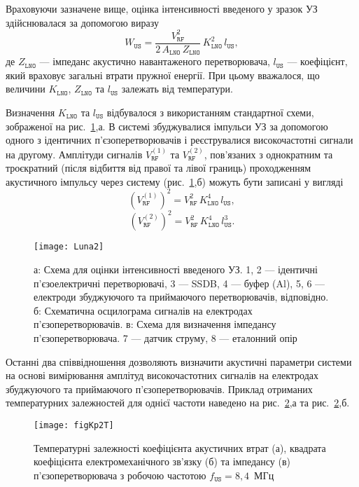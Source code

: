 Враховуючи зазначене вище, оцінка інтенсивності введеного у зразок УЗ здійснювалася за допомогою виразу
 \begin{equation}
 \label{eqWus2}
 W_\mathtt{US}=\frac{V_\mathtt{RF}^2}{2\,A_\mathtt{LNO}\,Z_\mathtt{LNO}}\,K_\mathtt{LNO}^2\,l_\mathtt{US},
 \end{equation}
де
$Z_\mathtt{LNO}$ --- імпеданс акустично навантаженого перетворювача,
$l_\mathtt{US}$ --- коефіцієнт, який враховує загальні втрати пружної енергії.
При цьому вважалося, що величини
$K_\mathtt{LNO}$, $Z_\mathtt{LNO}$ та $l_\mathtt{US}$ залежать від температури.

Визначення $K_\mathtt{LNO}$ та $l_\mathtt{US}$ відбувалося з використанням стандартної схеми,
зображеної на рис.~\ref{Luna2},а.
В системі збуджувалися імпульси УЗ за допомогою одного з ідентичних п'єзоперетворювачів і реєструвалися
високочастотні сигнали на другому.
Амплітуди сигналів $V_\mathtt{RF}^{(1)}$ та $V_\mathtt{RF}^{(2)}$, пов'язаних з однократним та троєкратний (після відбиття від правої та лівої границь) проходженням акустичного імпульсу через систему
(рис.~\ref{Luna2},б) можуть бути записані у вигляді
 \begin{equation}
 \label{eqVrf1}
 (V_\mathtt{RF}^{(1)})^2=V_\mathtt{RF}^2\,K_\mathtt{LNO}^4\,l_\mathtt{US},
 \end{equation}
 \begin{equation}
 \label{eqVrf2}
 (V_\mathtt{RF}^{(2)})^2=V_\mathtt{RF}^2\,K_\mathtt{LNO}^4\,l_\mathtt{US}^3.
 \end{equation}

\begin{figure}
\center
\texttt{[image: Luna2]}%
\caption{\label{Luna2}
а: Схема для оцінки інтенсивності введеного УЗ.
1, 2 --- ідентичні п'єзоелектричні перетворювачі,
3 --- SSDB,
4 --- буфер (Al),
5, 6 --- електроди збуджуючого та приймаючого перетворювачів, відповідно.
б: Схематична осцилограма сигналів на електродах п'єзоперетворювачів.
в: Схема для визначення імпедансу п'єзоперетворювача.
7 --- датчик струму,
8 --- еталонний опір
}
\end{figure}

Останні два співвідношення дозволяють визначити акустичні параметри системи на основі вимірювання амплітуд
високочастотних сигналів на електродах збуджуючого та приймаючого п'єзоперетворювачів.
Приклад отриманих температурних залежностей для однієї частоти наведено на рис.~\ref{figKp2T},а та рис.~\ref{figKp2T},б.

\begin{figure}
\center
\texttt{[image: figKp2T]}%
\caption{\label{figKp2T}
Температурні залежності коефіцієнта акустичних втрат (а),
квадрата коефіцієнта електромеханічного зв'язку (б) та
імпедансу (в) п'єзоперетворювача з робочою частотою $f_\mathtt{US}=8,4$~МГц}
\end{figure}

